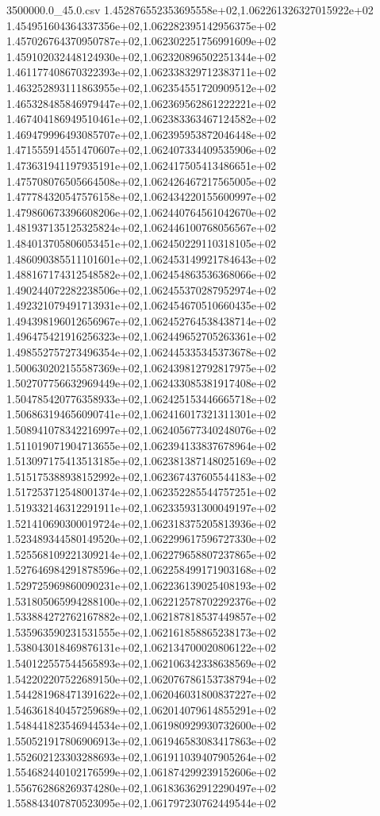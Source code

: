 \begin{filecontents*}{3500000.0_45.0.csv}
1.452876552353695558e+02,1.062261326327015922e+02
1.454951604364337356e+02,1.062282395142956375e+02
1.457026764370950787e+02,1.062302251756991609e+02
1.459102032448124930e+02,1.062320896502251344e+02
1.461177408670322393e+02,1.062338329712383711e+02
1.463252893111863955e+02,1.062354551720909512e+02
1.465328485846979447e+02,1.062369562861222221e+02
1.467404186949510461e+02,1.062383363467124582e+02
1.469479996493085707e+02,1.062395953872046448e+02
1.471555914551470607e+02,1.062407334409535906e+02
1.473631941197935191e+02,1.062417505413486651e+02
1.475708076505664508e+02,1.062426467217565005e+02
1.477784320547576158e+02,1.062434220155600997e+02
1.479860673396608206e+02,1.062440764561042670e+02
1.481937135125325824e+02,1.062446100768056567e+02
1.484013705806053451e+02,1.062450229110318105e+02
1.486090385511101601e+02,1.062453149921784643e+02
1.488167174312548582e+02,1.062454863536368066e+02
1.490244072282238506e+02,1.062455370287952974e+02
1.492321079491713931e+02,1.062454670510660435e+02
1.494398196012656967e+02,1.062452764538438714e+02
1.496475421916256323e+02,1.062449652705263361e+02
1.498552757273496354e+02,1.062445335345373678e+02
1.500630202155587369e+02,1.062439812792817975e+02
1.502707756632969449e+02,1.062433085381917408e+02
1.504785420776358933e+02,1.062425153446665718e+02
1.506863194656090741e+02,1.062416017321311301e+02
1.508941078342216997e+02,1.062405677340248076e+02
1.511019071904713655e+02,1.062394133837678964e+02
1.513097175413513185e+02,1.062381387148025169e+02
1.515175388938152992e+02,1.062367437605544183e+02
1.517253712548001374e+02,1.062352285544757251e+02
1.519332146312291911e+02,1.062335931300049197e+02
1.521410690300019724e+02,1.062318375205813936e+02
1.523489344580149520e+02,1.062299617596727330e+02
1.525568109221309214e+02,1.062279658807237865e+02
1.527646984291878596e+02,1.062258499171903168e+02
1.529725969860090231e+02,1.062236139025408193e+02
1.531805065994288100e+02,1.062212578702292376e+02
1.533884272762167882e+02,1.062187818537449857e+02
1.535963590231531555e+02,1.062161858865238173e+02
1.538043018469876131e+02,1.062134700020806122e+02
1.540122557544565893e+02,1.062106342338638569e+02
1.542202207522689150e+02,1.062076786153738794e+02
1.544281968471391622e+02,1.062046031800837227e+02
1.546361840457259689e+02,1.062014079614855291e+02
1.548441823546944534e+02,1.061980929930732600e+02
1.550521917806906913e+02,1.061946583083417863e+02
1.552602123303288693e+02,1.061911039407905264e+02
1.554682440102176599e+02,1.061874299239152606e+02
1.556762868269374280e+02,1.061836362912290497e+02
1.558843407870523095e+02,1.061797230762449544e+02

\end{filecontents*}

